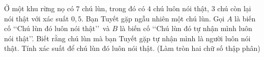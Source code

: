 \begin{ex}%
	Ở một khu rừng nọ có $7$ chú lùn, trong đó có $4$ chú luôn nói thật, $3$ chú còn lại nói thật với xác suất $0{,}5$. Bạn Tuyết gặp ngẫu nhiên một chú lùn. Gọi $A$ là biến cố \lq\lq Chú lùn đó luôn nói thật\rq\rq\, và $B$ là biến cố \lq\lq Chú lùn đó tự nhận mình luôn nói thật\rq\rq. Biết rằng chú lùn mà bạn Tuyết gặp tự nhận mình là người luôn nói thật. Tính xác suất để chú lùn đó luôn nói thật. (Làm tròn hai chữ số thập phân)
\end{ex}

